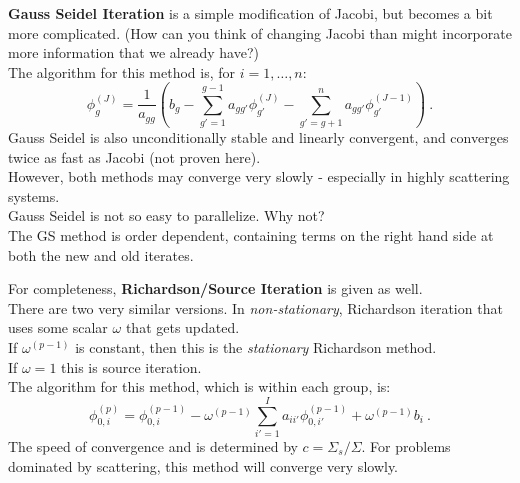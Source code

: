 \documentclass[12pt]{article}
\newcommand{\ve}[1]{\ensuremath{\mathbf{#1}}}
\begin{document}
\textbf{Gauss Seidel Iteration} is a simple modification of Jacobi, but becomes a bit more complicated. (How can you think of changing Jacobi than might incorporate more information that we already have?)\\
The algorithm for this method is, for $i = 1, \dots, n$:
\[ \phi^{(J)}_g = \frac{1}{a_{gg}}(b_g - \sum_{g'=1}^{g-1} a_{gg'} \phi_{g'}^{(J)} - \sum_{g'=g+1}^{n} a_{gg'} \phi_{g'}^{(J-1)}) \:.\]
%
Gauss Seidel is also unconditionally stable and linearly convergent, and 
converges twice as fast as Jacobi (not proven here). \\
However, both methods may converge very slowly - especially in highly scattering systems.%
%
%
%
\\
Gauss Seidel is not so easy to parallelize. Why not? \\The GS method is order dependent, containing terms on the right hand side at both the new and old iterates.

For completeness, \textbf{Richardson/Source Iteration} is given as well.\\ There are two very similar versions. In \textit{non-stationary}, Richardson iteration that uses some scalar $\omega$ that gets updated.\\
If $\omega^{(p-1)}$ is constant, then this is the \textit{stationary} Richardson method. \\ 
If $\omega = 1$ this is source iteration.\\
%
The algorithm for this method, which is within each group, is:
\[\phi_{0,i}^{(p)} =  \phi^{(p-1)}_{0,i} - \omega^{(p-1)} \sum_{i'=1}^{I} a_{ii'}\phi_{0,i'}^{(p-1)} + \omega^{(p-1)} b_i \:.\]
%
The speed of convergence and is determined by $c = \Sigma_s / \Sigma$. For problems dominated by scattering, this method will converge very slowly. 
\end{document}
